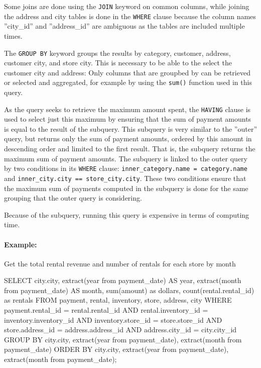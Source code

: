\begin{withcode}
Some joins are done using the \texttt{JOIN} keyword on common columns, while joining the address and city tables is done in the \texttt{WHERE} clause because the column names ''city\_id'' and ''address\_id'' are ambiguous as the tables are included multiple times. 

The \texttt{GROUP BY} keyword groups the results by category, customer, address, customer city, and store city. This is necessary to be able to the select the customer city and address: Only columns that are groupbed by can be retrieved or selected and aggregated, for example by using the \texttt{sum()} function used in this query. 

As the query seeks to retrieve the maximum amount spent, the \texttt{HAVING} clause is used to select just this maximum by ensuring that the sum of payment amounts is equal to the result of the subquery. This subquery is very similar to the ''outer'' query, but returns only the sum of payment amounts, ordered by this amount in descending order and limited to the first result. That is, the subquery returns the maximum sum of payment amounts. The subquery is linked to the outer query by two conditions in its \texttt{WHERE} clause: \texttt{inner\_category.name = category.name} and \texttt{inner\_city.city == store\_city.city}. These two conditions ensure that the maximum sum of payments computed in the subquery is done for the same grouping that the outer query is considering.

Because of the subquery, running this query is expensive in terms of computing time.

\paragraph*{Example:}
Get the total rental revenue and number of rentals for each store by month


\begin{sqlcode}
SELECT city.city, 
       extract(year from payment_date) AS year, 
       extract(month from payment_date) AS month, 
       sum(amount) as dollars, 
       count(rental.rental_id) as rentals
FROM payment, rental, inventory, store, address, city
WHERE payment.rental_id = rental.rental_id AND
      rental.inventory_id = inventory.inventory_id AND
      inventory.store_id = store.store_id AND
      store.address_id = address.address_id AND
      address.city_id = city.city_id
GROUP BY city.city, 
         extract(year from payment_date), 
         extract(month from payment_date)
ORDER BY city.city, 
         extract(year from payment_date), 
         extract(month from payment_date);
\end{sqlcode}


\end{withcode}
